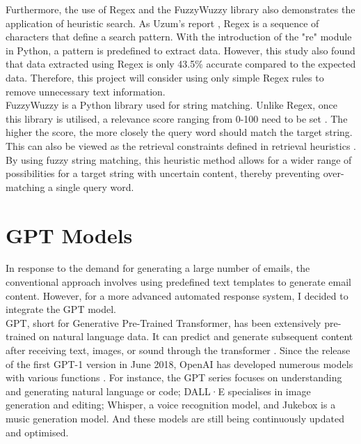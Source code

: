 \documentclass[ oneside,%
                    author={Cassie Qing Tang},
                    degree={BSc},
                     title={An Automated Response System for Disrupting Online Pet Scamming \\ },
                    subtitle={ }]{dissertation}
\begin{document}
Furthermore, the use of Regex and the FuzzyWuzzy library also demonstrates the application of heuristic search. As Uzum's report \cite{uzun_comparison_2018}, Regex is a sequence of characters that define a search pattern. With the introduction of the "re" module in Python, a pattern is predefined to extract data. However, this study also found that data extracted using Regex is only 43.5\% accurate compared to the expected data. Therefore, this project will consider using only simple Regex rules to remove unnecessary text information. 
\\

FuzzyWuzzy is a Python library used for string matching. Unlike Regex, once this library is utilised, a relevance score ranging from 0-100 need to be set \cite{majumder_fuzzywuzzy_2021}. The higher the score, the more closely the query word should match the target string. This can also be viewed as the retrieval constraints defined in retrieval heuristics \cite{yang_secure_2021}. By using fuzzy string matching, this heuristic method allows for a wider range of possibilities for a target string with uncertain content, thereby preventing over-matching a single query word.


\section{GPT Models}
In response to the demand for generating a large number of emails, the conventional approach involves using predefined text templates to generate email content. However, for a more advanced automated response system, I decided to integrate the GPT model.
\\

GPT, short for Generative Pre-Trained Transformer, has been extensively pre-trained on natural language data. It can predict and generate subsequent content after receiving text, images, or sound through the transformer \cite{3blue1brown_but_2024}. Since the release of the first GPT-1 version in June 2018, OpenAI has developed numerous models with various functions \cite{noauthor_openai_nodate}. For instance, the GPT series focuses on understanding and generating natural language or code; DALL·E specialises in image generation and editing; Whisper, a voice recognition model, and Jukebox is a music generation model. And these models are still being continuously updated and optimised.
\\
\end{document}

